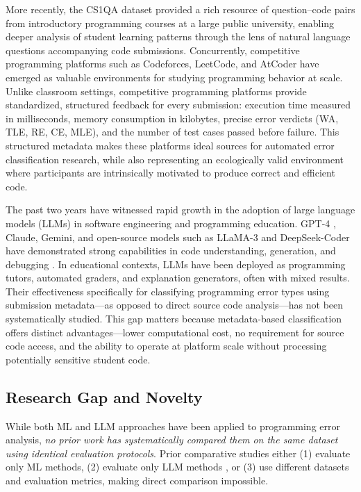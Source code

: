 \documentclass[10pt,letterpaper]{article}
\begin{document}
More recently, the CS1QA dataset \cite{lee2022cs1qa} provided a rich resource
of question--code pairs from introductory programming courses at a large
public university, enabling deeper analysis of student learning patterns
through the lens of natural language questions accompanying code submissions.
Concurrently, competitive programming platforms such as Codeforces, LeetCode,
and AtCoder have emerged as valuable environments for studying programming
behavior at scale. Unlike classroom settings, competitive programming
platforms provide standardized, structured feedback for every submission:
execution time measured in milliseconds, memory consumption in kilobytes,
precise error verdicts (WA, TLE, RE, CE, MLE), and the number of test cases
passed before failure. This structured metadata makes these platforms ideal
sources for automated error classification research, while also representing
an ecologically valid environment where participants are intrinsically
motivated to produce correct and efficient code.

The past two years have witnessed rapid growth in the adoption of large
language models (LLMs) in software engineering and programming education.
GPT-4 \cite{openai2024gpt4}, Claude, Gemini, and open-source models such as
LLaMA-3 \cite{dubey2024llama} and DeepSeek-Coder have demonstrated strong capabilities in code
understanding, generation, and debugging \cite{raihan2025large}\cite{zamfirescu2023what}\cite{prather2024code}\cite{kazemitabaar2024impact}. In educational contexts, LLMs have been deployed as
programming tutors, automated graders, and explanation generators, often with
mixed results. Their effectiveness specifically for classifying
programming error types using submission metadata---as opposed to direct
source code analysis---has not been systematically studied. This gap matters
because metadata-based classification offers distinct advantages---lower
computational cost, no requirement for source code access, and the ability to
operate at platform scale without processing potentially sensitive student
code.


\subsection*{Research Gap and Novelty}

While both ML and LLM approaches have been applied to programming error
analysis, \textit{no prior work has systematically compared them on the same
dataset using identical evaluation protocols}. Prior comparative studies either
(1) evaluate only ML methods,
(2) evaluate only LLM methods \cite{raihan2025large,zamfirescu2023what},
or (3) use different datasets and evaluation metrics, making direct comparison
impossible.
\end{document}
